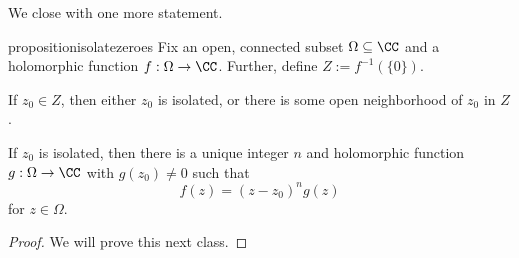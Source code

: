 We close with one more statement.
\begin{restatable}{proposition}{isolatezeroes} \label{prop:isolatezeroes}
	Fix an open, connected subset $\Omega\subseteq\CC$ and a holomorphic function $f:\Omega\to\CC$. Further, define $Z:=f^{-1}(\{0\})$.
	\begin{listalph}
		\item If $z_0\in Z$, then either $z_0$ is isolated, or there is some open neighborhood of $z_0$ in $Z$.
		\item If $z_0$ is isolated, then there is a unique integer $n$ and holomorphic function $g:\Omega\to\CC$ with $g(z_0)\ne0$ such that
		\[f(z)=(z-z_0)^ng(z)\]
		for $z\in\Omega$.
	\end{listalph}
\end{restatable}
\begin{proof}
	We will prove this next class.
\end{proof}